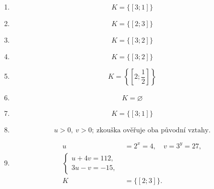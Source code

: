 \documentclass[11pt,a4paper]{article}
\begin{document}
\begin{zadaniReseniBox}[title={Domácí úkol}]
\begin{enumerate}[label=\alph*)]
\end{enumerate}
\tcblower
\setlength{\abovedisplayskip}{2pt}\setlength{\belowdisplayskip}{2pt}
\setlength{\abovedisplayshortskip}{2pt}\setlength{\belowdisplayshortskip}{2pt}
\begin{enumerate}[label=\alph*)]
\item \[K=\{[3;1]\}\]
\item \[K=\{[2;3]\}\]
\item \[K=\{[3;2]\}\]
\item \[K=\{[3;2]\}\]
\item \[K=\left\{\left[2;\frac{1}{2}\right]\right\}\]
\item \[K=\varnothing\]
\item \[K=\{[3;1]\}\]
\item \[u>0,\ v>0;\ \text{zkouška ověřuje oba původní vztahy.}\]
\item \[\begin{aligned}u&=2^x=4,\quad v=3^y=27,\\\begin{cases}u+4v=112,\\3u-v=-15,\end{cases}\\K&=\{[2;3]\}.\end{aligned}\]
\end{enumerate}
\end{zadaniReseniBox}
\end{document}
